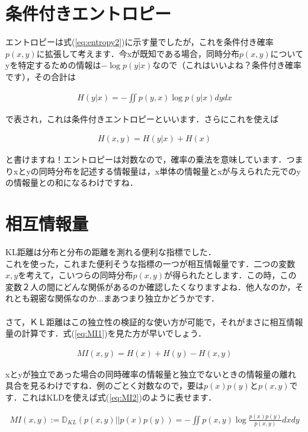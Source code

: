\documentclass[11pt,a4paper]{ujreport}
\begin{document}
\section{条件付きエントロピー}
エントロピーは式(\ref{eq:entropy2})に示す量でしたが，これを条件付き確率$p(x,y)$に拡張して考えます．今xが既知である場合，同時分布$p(x,y)$についてyを特定するための情報は$-\log p(y|x)$なので（これはいいよね？条件付き確率です），その合計は

\begin{eqnarray}
\label{eq:cond_entropy1}
H(y|x) = - \iint p(y,x) \log p(y|x) dy dx
\end{eqnarray}

で表され，これは条件付きエントロピーといいます\cite{prml}\cite{dist}．さらにこれを使えば

\begin{eqnarray}
\label{eq:cond_entropy2}
H(x,y) = H(y|x) + H(x)
\end{eqnarray}

と書けますね！エントロピーは対数なので，確率の乗法を意味しています．つまりxとyの同時分布を記述する情報量は，x単体の情報量とxが与えられた元でのyの情報量との和になるわけですね．

\section{相互情報量}
KL距離は分布と分布の距離を測れる便利な指標でした．\\

これを使った，これまた便利そうな指標の一つが相互情報量です．二つの変数$x, y$を考えて，こいつらの同時分布$p(x,y)$が得られたとします．この時，この変数２人の間にどんな関係があるのか確認したくなりますよね．他人なのか，それとも親密な関係なのか...まあつまり独立かどうかです．\\
\\

さて，ＫＬ距離はこの独立性の検証的な使い方が可能で，それがまさに相互情報量の計算です．式(\ref{eq:MI1})を見た方が早いでしょう\cite{dist}．

\begin{eqnarray}
\label{eq:MI1}
MI(x,y) = H(x) + H(y) - H(x,y)
\end{eqnarray}

xとyが独立であった場合の同時確率の情報量と独立でないときの情報量の離れ具合を見るわけですね．例のごとく対数なので，要は$p(x)p(y)とp(x,y)$です．これはKLDを使えば式(\ref{eq:MI2})のように表せます．

\begin{eqnarray}
\label{eq:MI2}
  MI(x,y) := \mathbb{D}_{KL}(p(x,y) || p(x)p(y)) = -\iint p(x,y) \log \frac{p(x)p(y)}{p(x,y)} dxdy
\end{eqnarray}
\end{document}
